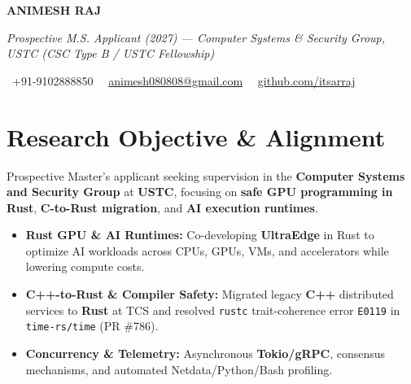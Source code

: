 \documentclass[a4paper,11pt]{article}
\newcommand{\socialicon}[1]{\raisebox{-0.05em}{\resizebox{!}{1em}{#1}}}
\newcommand{\headerfontiii}{\fontfamily{ppl}\selectfont} %
\begin{document}
\headerfontiii

\begin{center}
    {\Huge\textbf{ANIMESH RAJ}}
\end{center}
\vspace{-6mm}

\begin{center}
    {\small\textit{Prospective M.S. Applicant (2027) --- Computer Systems \& Security Group, USTC (CSC Type B / USTC Fellowship)}}
\end{center}
\vspace{-6mm}

\begin{center}
    {\small
    \socialicon{\faPhone}\ +91-9102888850 \textbar\ 
    \socialicon{\faEnvelope}\ \href{mailto:animesh080808@gmail.com}{animesh080808@gmail.com} \textbar\ 
    \socialicon{\faGithub}\ \href{https://github.com/itsarraj}{github.com/itsarraj}
    }
\end{center}
\vspace{-4mm}

\section{\textbf{Research Objective \& Alignment}}
\vspace{1mm}
{\small
Prospective Master's applicant seeking supervision in the \textbf{Computer Systems and Security Group} at \textbf{USTC}, focusing on \textbf{safe GPU programming in Rust}, \textbf{C-to-Rust migration}, and \textbf{AI execution runtimes}.
\begin{itemize}[leftmargin=3ex, itemsep=0.4mm, topsep=1mm]
    \item \textbf{Rust GPU \& AI Runtimes:} Co-developing \textbf{UltraEdge} in Rust to optimize AI workloads across CPUs, GPUs, VMs, and accelerators while lowering compute costs.
    \item \textbf{C++-to-Rust \& Compiler Safety:} Migrated legacy \textbf{C++} distributed services to \textbf{Rust} at TCS and resolved \texttt{rustc} trait-coherence error \texttt{E0119} in \texttt{time-rs/time} (PR \#786).
    \item \textbf{Concurrency \& Telemetry:} Asynchronous \textbf{Tokio/gRPC}, consensus mechanisms, and automated Netdata/Python/Bash profiling.
\end{itemize}
}
\vspace{-3mm}
\end{document}
